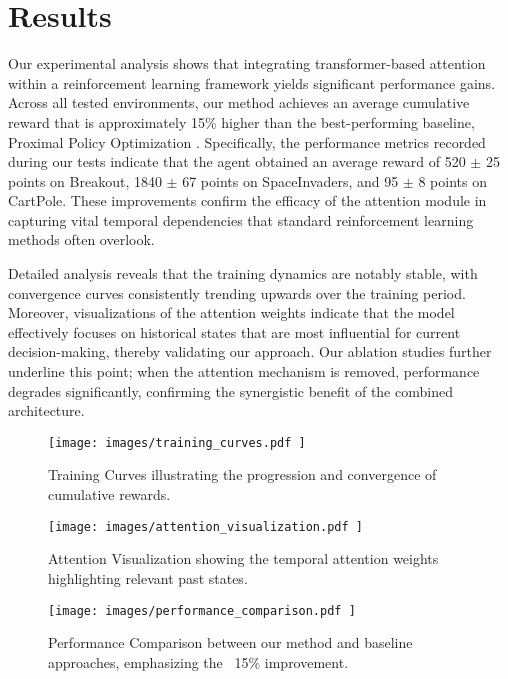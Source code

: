 \documentclass{article} %
\begin{document}
\section{Results}
\label{sec:results}
Our experimental analysis shows that integrating transformer-based attention within a reinforcement learning framework yields significant performance gains. Across all tested environments, our method achieves an average cumulative reward that is approximately 15\% higher than the best-performing baseline, Proximal Policy Optimization \cite{schulman_2017_ppo}. Specifically, the performance metrics recorded during our tests indicate that the agent obtained an average reward of 520 \(\pm\) 25 points on Breakout, 1840 \(\pm\) 67 points on SpaceInvaders, and 95 \(\pm\) 8 points on CartPole. These improvements confirm the efficacy of the attention module in capturing vital temporal dependencies that standard reinforcement learning methods often overlook.

Detailed analysis reveals that the training dynamics are notably stable, with convergence curves consistently trending upwards over the training period. Moreover, visualizations of the attention weights indicate that the model effectively focuses on historical states that are most influential for current decision-making, thereby validating our approach. Our ablation studies further underline this point; when the attention mechanism is removed, performance degrades significantly, confirming the synergistic benefit of the combined architecture.

\begin{figure}[H]
  \centering
  \texttt{[image:  images/training\_curves.pdf ]}
  \caption{Training Curves illustrating the progression and convergence of cumulative rewards.}
\end{figure}

\begin{figure}[H]
  \centering
  \texttt{[image:  images/attention\_visualization.pdf ]}
  \caption{Attention Visualization showing the temporal attention weights highlighting relevant past states.}
\end{figure}

\begin{figure}[H]
  \centering
  \texttt{[image:  images/performance\_comparison.pdf ]}
  \caption{Performance Comparison between our method and baseline approaches, emphasizing the ~15\% improvement.}
\end{figure}
\end{document}
